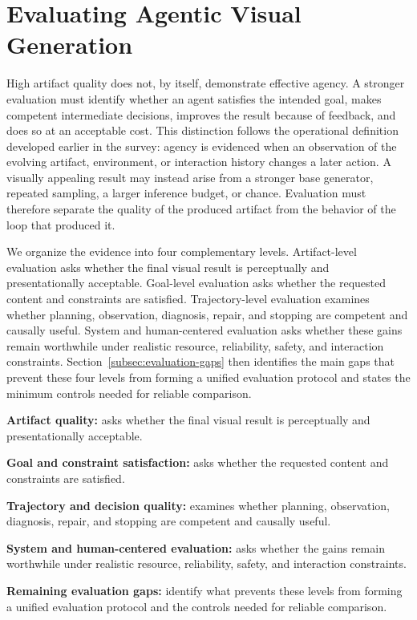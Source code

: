 \section{Evaluating Agentic Visual Generation}
\label{sec:evaluation}

High artifact quality does not, by itself, demonstrate effective agency. A stronger evaluation must identify whether an agent satisfies the intended goal, makes competent intermediate decisions, improves the result because of feedback, and does so at an acceptable cost. This distinction follows the operational definition developed earlier in the survey: agency is evidenced when an observation of the evolving artifact, environment, or interaction history changes a later action. A visually appealing result may instead arise from a stronger base generator, repeated sampling, a larger inference budget, or chance. Evaluation must therefore separate the quality of the produced artifact from the behavior of the loop that produced it.

We organize the evidence into four complementary levels. Artifact-level evaluation asks whether the final visual result is perceptually and presentationally acceptable. Goal-level evaluation asks whether the requested content and constraints are satisfied. Trajectory-level evaluation examines whether planning, observation, diagnosis, repair, and stopping are competent and causally useful. System and human-centered evaluation asks whether these gains remain worthwhile under realistic resource, reliability, safety, and interaction constraints. Section~\ref{subsec:evaluation-gaps} then identifies the main gaps that prevent these four levels from forming a unified evaluation protocol and states the minimum controls needed for reliable comparison.

\begin{keytakeaway}
\begin{keypoints}
  \item \textbf{Artifact quality:} asks whether the final visual result is perceptually and presentationally acceptable.
  \item \textbf{Goal and constraint satisfaction:} asks whether the requested content and constraints are satisfied.
  \item \textbf{Trajectory and decision quality:} examines whether planning, observation, diagnosis, repair, and stopping are competent and causally useful.
  \item \textbf{System and human-centered evaluation:} asks whether the gains remain worthwhile under realistic resource, reliability, safety, and interaction constraints.
  \item \textbf{Remaining evaluation gaps:} identify what prevents these levels from forming a unified evaluation protocol and the controls needed for reliable comparison.
\end{keypoints}
\end{keytakeaway}

